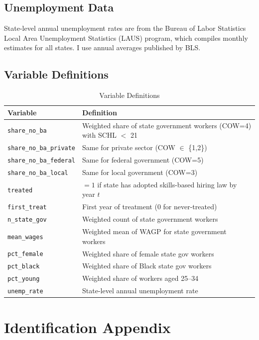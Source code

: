 \documentclass[12pt]{article}
\begin{document}
\subsection{Unemployment Data}

State-level annual unemployment rates are from the Bureau of Labor Statistics Local Area Unemployment Statistics (LAUS) program, which compiles monthly estimates for all states. I use annual averages published by BLS.

\subsection{Variable Definitions}

\begin{table}[H]
\centering
\caption{Variable Definitions}
\label{tab:variables}
\small
\begin{tabular}{lp{10cm}}
\toprule
Variable & Definition \\
\midrule
\texttt{share\_no\_ba} & Weighted share of state government workers (COW=4) with SCHL $<$ 21 \\
\texttt{share\_no\_ba\_private} & Same for private sector (COW $\in$ \{1,2\}) \\
\texttt{share\_no\_ba\_federal} & Same for federal government (COW=5) \\
\texttt{share\_no\_ba\_local} & Same for local government (COW=3) \\
\texttt{treated} & $=1$ if state has adopted skills-based hiring law by year $t$ \\
\texttt{first\_treat} & First year of treatment (0 for never-treated) \\
\texttt{n\_state\_gov} & Weighted count of state government workers \\
\texttt{mean\_wages} & Weighted mean of WAGP for state government workers \\
\texttt{pct\_female} & Weighted share of female state gov workers \\
\texttt{pct\_black} & Weighted share of Black state gov workers \\
\texttt{pct\_young} & Weighted share of workers aged 25--34 \\
\texttt{unemp\_rate} & State-level annual unemployment rate \\
\bottomrule
\end{tabular}
\end{table}


\section{Identification Appendix} \label{app:identification}
\end{document}
